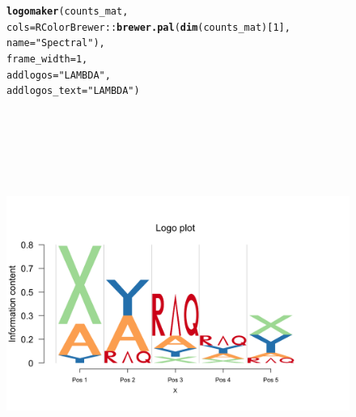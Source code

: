 \documentclass[12pt]{article}\usepackage[]{graphicx}\usepackage[usenames,dvipsnames]{color}
\makeatletter
\newcommand{\hlnum}[1]{\textcolor[rgb]{0.686,0.059,0.569}{#1}}%
\newcommand{\hlstr}[1]{\textcolor[rgb]{0.192,0.494,0.8}{#1}}%
\newcommand{\hlopt}[1]{\textcolor[rgb]{0,0,0}{#1}}%
\newcommand{\hlstd}[1]{\textcolor[rgb]{0.345,0.345,0.345}{#1}}%
\newcommand{\hlkwc}[1]{\textcolor[rgb]{0.333,0.667,0.333}{#1}}%
\newcommand{\hlkwd}[1]{\textcolor[rgb]{0.737,0.353,0.396}{\textbf{#1}}}%
\newenvironment{kframe}{%
 \def\at@end@of@kframe{}%
 \ifinner\ifhmode%
  \def\at@end@of@kframe{\end{minipage}}%
  \begin{minipage}{\columnwidth}%
 \fi\fi%
 \def\FrameCommand##1{\hskip\@totalleftmargin \hskip-\fboxsep
 \colorbox{shadecolor}{##1}\hskip-\fboxsep
     \hskip-\linewidth \hskip-\@totalleftmargin \hskip\columnwidth}%
 \MakeFramed {\advance\hsize-\width
   \@totalleftmargin\z@ \linewidth\hsize
   \@setminipage}}%
 {\par\unskip\endMakeFramed%
 \at@end@of@kframe}
\newenvironment{knitrout}{}{} %
\makeatother
\begin{document}
\begin{figure}
\begin{center}
\begin{knitrout}
\color{fgcolor}\begin{kframe}
\begin{alltt}
\hlkwd{logomaker}\hlstd{(counts_mat,}
          \hlkwc{cols}\hlstd{= RColorBrewer}\hlopt{::}\hlkwd{brewer.pal}\hlstd{(}\hlkwd{dim}\hlstd{(counts_mat)[}\hlnum{1}\hlstd{],}
          \hlkwc{name} \hlstd{=} \hlstr{"Spectral"}\hlstd{),}
          \hlkwc{frame_width} \hlstd{=} \hlnum{1}\hlstd{,}
          \hlkwc{addlogos}\hlstd{=}\hlstr{"LAMBDA"}\hlstd{,}
          \hlkwc{addlogos_text}\hlstd{=}\hlstr{"LAMBDA"}\hlstd{)}
\end{alltt}
\end{kframe}
\includegraphics[width=8in,height=5in]{figure/logolas_use_17-1} 

\end{knitrout}
\end{center}
\end{figure}
\end{document}
